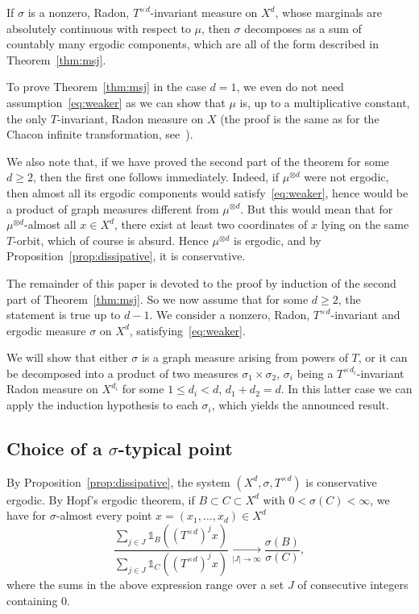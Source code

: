 \documentclass[AHL,Unicode,longabstracts]{cedram}
\newcommand{\tend}[3][]{\xrightarrow[#2\to#3]{#1}}
\newcommand{\ind}[1]{\mathds{1}_{#1}}
\newcommand{\td}{T^{\times d}}
\begin{document}
\begin{coro}\label{cor:main}
If $\sigma$ is a nonzero, Radon, $\td$-invariant measure on $X^d$, whose marginals are absolutely continuous with respect to $\mu$, then $\sigma$ decomposes as a sum of countably many ergodic components, which are all of the form described in Theorem~\ref{thm:msj}.
\end{coro}

To prove Theorem~\ref{thm:msj} in the case $d=1$, we even do not need assumption~\eqref{eq:weaker} as we can show that $\mu$ is, up to a multiplicative constant, the only $T$-invariant, Radon measure on $X$ (the proof is the same as for the Chacon infinite transformation, see~\cite[Proposition~2.4]{ChaconInfinite}).

We also note that, if we have proved the second part of the theorem for some $d\ge2$, then the first one follows immediately. Indeed, if $\mu^{\otimes d}$ were not ergodic, then almost all its ergodic components would satisfy~\eqref{eq:weaker}, hence would be a product of graph measures different from $\mu^{\otimes d}$. But this would mean that for $\mu^{\otimes d}$-almost all $x\in X^d$, there exist at least two coordinates of $x$ lying on the same $T$-orbit, which of course is absurd. Hence $\mu^{\otimes d}$ is ergodic, and by Proposition~\ref{prop:dissipative}, it is conservative.


The remainder of this paper is devoted to the proof by induction of the second part of Theorem~\ref{thm:msj}. So we now assume that for some $d\ge2$, the statement is true up to $d-1$. We consider a nonzero, Radon, $\td$-invariant and ergodic measure $\sigma$ on $X^d$, satisfying~\eqref{eq:weaker}.

We will show that either $\sigma$ is a graph measure arising from powers of $T$, or it can be decomposed into a product of two measures $\sigma_1\times\sigma_2$, $\sigma_i$ being a $T^{\times d_i}$-invariant Radon measure on $X^{d_i}$ for some $1\le d_i<d$, $d_1+d_2=d$. In this latter case we can apply the induction hypothesis to each $\sigma_i$, which yields the announced result.

\subsection{Choice of a \texorpdfstring{$\sigma$}{sigma}-typical point}\label{sec:typicalpoint}

By Proposition~\ref{prop:dissipative}, the system $(X^d,\sigma,\td)$ is conservative ergodic. By Hopf's ergodic theorem, if $B\subset C\subset X^d$ with $0<\sigma(C)<\infty$, we have for $\sigma$-almost every point $x=(x_1,\ldots,x_d)\in X^d$
\begin{equation}\label{eq:Hopf}
\dfrac{\sum_{j\in J}\ind{B}((\td)^jx)}{\sum_{j\in J}\ind{C}((\td)^jx)}
\tend{|J|}{\infty} \dfrac{\sigma(B)}{\sigma(C)},
\end{equation}
where the sums in the above expression range over a set $J$ of consecutive integers containing 0.
\end{document}
